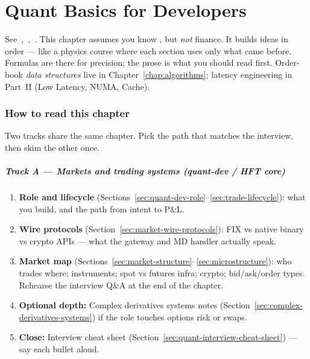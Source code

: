 \chapter{Quant Basics for Developers}
\label{chap:quantbasics}

See~\cite{hull-options},~\cite{shreve-finance},~\cite{wilmott-quant}.
\newline
This chapter assumes you know , but \emph{not} finance. 
It builds ideas in order --- like a physics course where each section uses only what came 
before. Formulas are there for precision; the prose is what you should read first.
Order-book \emph{data structures} live in Chapter~\ref{chap:algorithms}; latency 
engineering in Part~II (Low Latency, NUMA, Cache).

\subsection*{How to read this chapter}
Two tracks share the same chapter. Pick the path that matches the interview, then 
skim the other once.

\paragraph*{Track A --- Markets and trading systems (quant-dev / HFT core)}
\begin{enumerate}
    \item \textbf{Role and lifecycle} 
          (Sections~\ref{sec:quant-dev-role}--\ref{sec:trade-lifecycle}): 
          what you build, and the path from intent to P\&L.
    \item \textbf{Wire protocols} 
          (Section~\ref{sec:market-wire-protocols}): 
          FIX vs native binary vs crypto APIs --- what the gateway and MD 
          handler actually speak.
    \item \textbf{Market map} 
          (Sections~\ref{sec:market-structure}--\ref{sec:microstructure}): 
          who trades where; instruments; spot vs futures infra; crypto; 
          bid/ask/order types. Rehearse the interview Q\&A at the end of the chapter.
    \item \textbf{Optional depth:} Complex derivatives systems notes 
          (Section~\ref{sec:complex-derivatives-systems}) if the role touches 
          options risk or swaps.
    \item \textbf{Close:} Interview cheat sheet 
          (Section~\ref{sec:quant-interview-cheat-sheet}) --- say each bullet aloud.
\end{enumerate}

